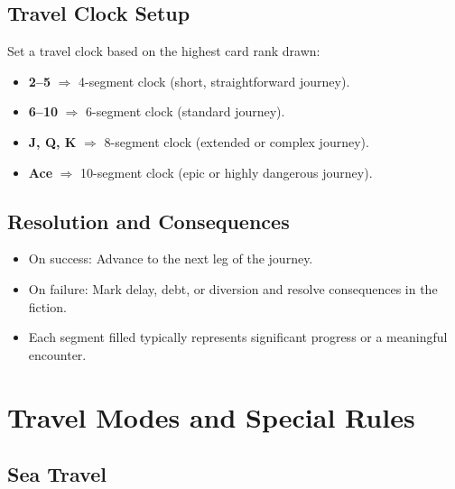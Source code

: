 \subsection{Travel Clock Setup}
\label{subsec:travel-clock}

Set a travel clock based on the highest card rank drawn:
\begin{itemize}
\item \textbf{2--5} $\Rightarrow$ 4-segment clock (short, straightforward journey).
\item \textbf{6--10} $\Rightarrow$ 6-segment clock (standard journey).
\item \textbf{J, Q, K} $\Rightarrow$ 8-segment clock (extended or complex journey).
\item \textbf{Ace} $\Rightarrow$ 10-segment clock (epic or highly dangerous journey).
\end{itemize}

\subsection{Resolution and Consequences}
\label{subsec:travel-resolution}

\begin{itemize}
\item On success: Advance to the next leg of the journey.
\item On failure: Mark delay, debt, or diversion and resolve consequences in the fiction.
\item Each segment filled typically represents significant progress or a meaningful encounter.
\end{itemize}

\section{Travel Modes and Special Rules}
\label{sec:travel-modes}

\subsection{Sea Travel}
\label{subsec:sea-travel}

